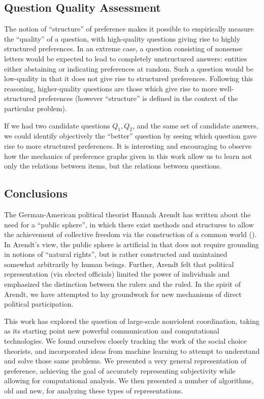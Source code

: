 \subsection{Question Quality Assessment}

The notion of ``structure'' of preference makes it possible to empirically measure the ``quality'' of a question, with high-quality questions giving rise to highly structured preferences.
In an extreme case, a question consisting of nonsense letters would be expected to lead to completely unstructured answers: entities either abstaining or indicating preferences at random.
Such a question would be low-quality in that it does not give rise to structured preferences.
Following this reasoning, higher-quality questions are those which give rise to more well-structured preferences (however ``structure'' is defined in the context of the particular problem).

If we had two candidate questions $Q_1, Q_2$, and the same set of candidate answers, we could identify objectively the ``better'' question by seeing which question gave rise to more structured preferences.
It is interesting and encouraging to observe how the mechanics of preference graphs given in this work allow us to learn not only the relations between items, but the relations between questions.

\subsection{Conclusions}

The German-American political theorist Hannah Arendt has written about the need for a ``public sphere'', in which there exist methods and structures to allow the achievement of collective freedom via the construction of a common world (\cite{dentreves:2016}).
In Arendt's view, the public sphere is artificial in that does not require grounding in notions of ``natural rights'', but is rather constructed and maintained somewhat arbitrarily by human beings.
Further, Arendt felt that political representation (via elected officials) limited the power of individuals and emphasized the distinction between the rulers and the ruled.
In the spirit of Arendt, we have attempted to lay groundwork for new mechanisms of direct political participation.

\bigskip

This work has explored the question of large-scale nonviolent coordination, taking as its starting point new powerful communication and computational technologies.
We found ourselves closely tracking the work of the social choice theorists, and incorporated ideas from machine learning to attempt to understand and solve those same problems.
We presented a very general representation of preference, achieving the goal of accurately representing subjectivity while allowing for computational analysis.
We then presented a number of algorithms, old and new, for analyzing these types of representations.

